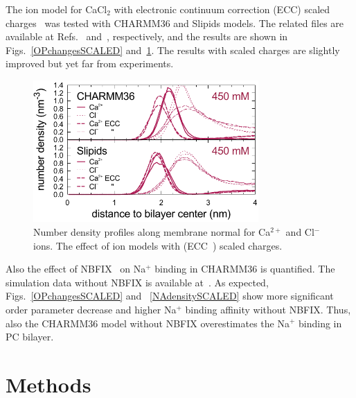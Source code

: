 \documentclass[twoside,twocolumn,9pt]{article}
\begin{document}
The ion model for CaCl$_2$ with electronic continuum correction (ECC) scaled charges~\cite{kohagen14} was tested with CHARMM36 and Slipids models.
The related files are available at Refs.~ and~,
respectively, and the results are shown in Figs.~\ref{OPchangesSCALED} and~\ref{CAdensitySCALED}.
The results with scaled charges are slightly improved but yet far from experiments.

\begin{figure}[h]
  \centering
  \includegraphics[width=8.6cm]{../Fig/CaDensities_scaledions.pdf} 
  \caption{\label{CAdensitySCALED}
    Number density profiles along membrane normal for Ca$^{2+}$ and Cl$^-$ ions. 
    The effect of ion models with (ECC~\cite{kohagen16}) scaled charges.
}
\end{figure}

Also the effect of NBFIX~\cite{venable13} on Na$^+$ binding in CHARMM36 is quantified.
The simulation data without NBFIX is available at~\cite{charmmPOPC350mMNaClnoNBFIXfiles}.
As expected, Figs.~\ref{OPchangesSCALED} and ~\ref{NAdensitySCALED} show 
more significant order parameter decrease and higher Na$^+$ binding affinity
without NBFIX. Thus, also the CHARMM36 model without NBFIX overestimates the
Na$^+$ binding in PC bilayer.



\section{Methods}
\end{document}
